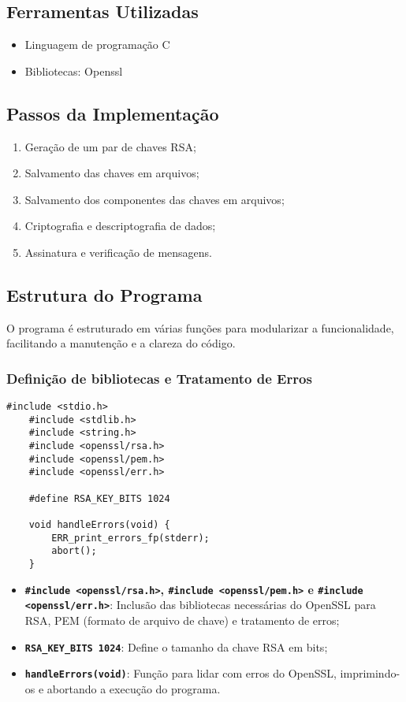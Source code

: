 \documentclass[a4paper,12pt]{article}
\begin{document}
\subsection*{Ferramentas Utilizadas}
\begin{itemize}
    \item Linguagem de programação C
    \item Bibliotecas: Openssl
\end{itemize}

\subsection*{Passos da Implementação}
\begin{enumerate}
    \item Geração de um par de chaves RSA;
    \item Salvamento das chaves em arquivos;
    \item Salvamento dos componentes das chaves em arquivos;
    \item Criptografia e descriptografia de dados;
    \item Assinatura e verificação de mensagens.
\end{enumerate}

\subsection*{Estrutura do Programa}
O programa é estruturado em várias funções para modularizar a funcionalidade, facilitando a manutenção e a clareza do código.

\subsubsection*{Definição de bibliotecas e Tratamento de Erros}
\begin{lstlisting}[style=CStyle]
    #include <stdio.h>
    #include <stdlib.h>
    #include <string.h>
    #include <openssl/rsa.h>
    #include <openssl/pem.h>
    #include <openssl/err.h>

    #define RSA_KEY_BITS 1024

    void handleErrors(void) {
        ERR_print_errors_fp(stderr);
        abort();
    }
\end{lstlisting}

\begin{itemize}
    \item \textbf{\lstinline[style=CStyle]{#include <openssl/rsa.h>}, \lstinline[style=CStyle]{#include <openssl/pem.h>} e \lstinline[style=CStyle]{#include <openssl/err.h>}}: Inclusão das bibliotecas necessárias do OpenSSL para RSA, PEM (formato de arquivo de chave) e tratamento de erros;
    \item \textbf{\lstinline[style=CStyle]{RSA_KEY_BITS 1024}}: Define o tamanho da chave RSA em bits;
    \item \textbf{\lstinline[style=CStyle]{handleErrors(void)}}: Função para lidar com erros do OpenSSL, imprimindo-os e abortando a execução do programa.
\end{itemize}
\end{document}
